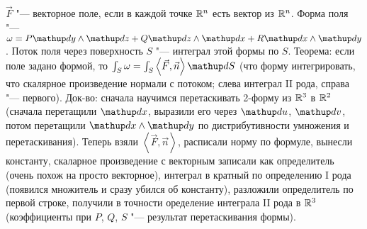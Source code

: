 \section{} %
$\vec F$ "--- векторное поле, если в каждой точке $\mathbb{R}^n$ есть вектор из $\mathbb{R}^n$.
Форма поля "--- $\omega = P\d y \wedge \d z + Q\d z \wedge \d x + R\d x \wedge \d y$.
Поток поля через поверхность $S$ "--- интеграл этой формы по $S$.
Теорема: если поле задано формой, то $\int_S \omega = \int_S \left<\vec F, \vec n\right> \d S$ (что форму интегрировать, что скалярное произведение нормали с потоком;
слева интеграл II рода, справа "--- первого).
Док-во: сначала научимся перетаскивать 2-форму из $\mathbb{R}^3$ в $\mathbb{R}^2$ (сначала перетащили $\d x$, выразили его через $\d u$, $\d v$,
потом перетащили $\d x \wedge \d y$ по дистрибутивности умножения и перетаскивания).
Теперь взяли $\left<\vec F, \vec n\right>$, расписали норму по формуле, вынесли константу, скаларное произведение с векторным записали как определитель
(очень похож на просто векторное), интеграл в кратный по определению I рода (появился множитель и сразу убился об константу), разложили
определитель по первой строке, получили в точности оределение интеграла II рода в $\mathbb{R}^3$ (коэффициенты при $P$, $Q$, $S$ "--- результат перетаскивания формы).

\section{} %
\TODO

\section{} %
\TODO
